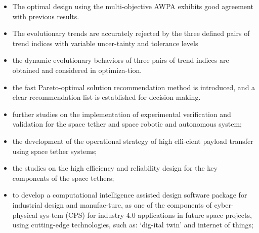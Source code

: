 \documentclass[conference]{IEEEtran}
\begin{document}
\begin{itemize}
    \item The optimal design using the multi-objective AWPA
exhibits good agreement with previous results.
    \item The evolutionary trends are accurately rejected by the
three defined pairs of trend indices with variable uncer-tainty and tolerance levels
    \item the dynamic evolutionary behaviors of three pairs of
trend indices are obtained and considered in optimiza-tion.
    \item the fast Pareto-optimal solution recommendation
method is introduced, and a clear recommendation list
is established for decision making.
    \item further studies on the implementation of experimental
verification and validation for the space tether and space
robotic and autonomous system;
    \item the development of the operational strategy of high effi-cient payload transfer using space tether systems;
    \item the studies on the high efficiency and reliability design
for the key components of the space tethers;
    \item to develop a computational intelligence assisted design
software package for industrial design and manufac-ture, as one of the components of cyber-physical sys-tem (CPS) for industry 4.0 applications in future space
projects, using cutting-edge technologies, such as: `dig-ital twin' and internet of things;

\end{itemize}
\end{document}
